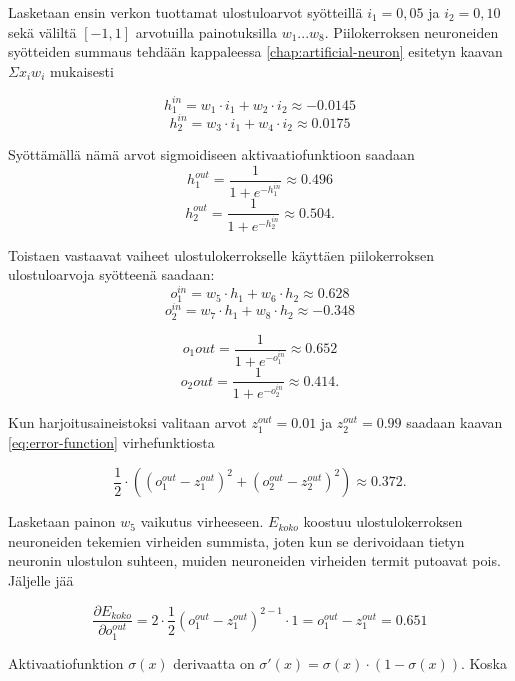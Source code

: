 \documentclass[finnish]{tktltiki2}
\theoremstyle{definition}
\theoremstyle{remark}
\begin{document}
  Lasketaan ensin verkon tuottamat ulostuloarvot syötteillä $i_1 = 0,05$ ja $i_2 = 0,10$ sekä väliltä $[-1, 1]$ arvotuilla painotuksilla $w_1...w_8$. Piilokerroksen neuroneiden syötteiden summaus tehdään kappaleessa \ref{chap:artificial-neuron} esitetyn kaavan $\Sigma x_i w_i$ mukaisesti
  
  $$h_{1}^{in} = w_1 \cdot i_1 + w_2 \cdot i_2 \approx -0.0145$$
  $$h_{2}^{in} = w_3 \cdot i_1 + w_4 \cdot i_2 \approx 0.0175$$

  Syöttämällä nämä arvot sigmoidiseen aktivaatiofunktioon saadaan
  $$h_{1}^{out} = \frac{1}{1 + e^{-h_{1}^{in}}} \approx 0.496$$
  $$h_{2}^{out} = \frac{1}{1 + e^{-h_{2}^{in}}} \approx 0.504.$$

  Toistaen vastaavat vaiheet ulostulokerrokselle käyttäen piilokerroksen ulostuloarvoja syötteenä saadaan:
  $$o_{1}^{in}= w_5 \cdot h_1 + w_6 \cdot h_2 \approx 0.628$$
  $$o_{2}^{in}= w_7 \cdot h_1 + w_8 \cdot h_2 \approx -0.348$$

  $$o_{1}out = \frac{1}{1 + e^{-o_{1}^{in}}} \approx 0.652$$
  $$o_{2}out = \frac{1}{1 + e^{-o_{2}^{in}}} \approx 0.414.$$

  Kun harjoitusaineistoksi valitaan arvot $z_{1}^{out} = 0.01$ ja $z_{2}^{out} = 0.99$ saadaan kaavan \ref{eq:error-function} virhefunktiosta 

  
  $$ \frac{1}{2} \cdot ( (o_{1}^{out} - z_1^{out})^2 + (o_{2}^{out} - z_2^{out})^2 ) \approx 0.372. $$


  Lasketaan painon $w_5$ vaikutus virheeseen. $E_{koko}$ koostuu ulostulokerroksen neuroneiden tekemien virheiden summista, joten kun se derivoidaan tietyn neuronin ulostulon suhteen, muiden neuroneiden virheiden termit putoavat pois. Jäljelle jää 
  
  $$ \frac{\partial E_{koko}}{\partial o_{1}^{out}} = 2 \cdot \frac{1}{2} (o_{1}^{out} - z_1^{out})^{2-1} \cdot 1 = o_{1}^{out} - z_1^{out} = 0.651$$

  Aktivaatiofunktion $\sigma (x)$ derivaatta on $\sigma'(x) = \sigma(x) \cdot (1 - \sigma(x))$.
  Koska 
  
\end{document}
